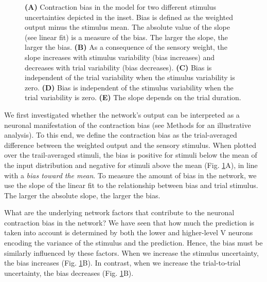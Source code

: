 \documentclass[10pt,a4paper,draft]{article}
\begin{document}
\begin{figure}[t!]
{{\bf (A)} Contraction bias in the model for two different stimulus uncertainties depicted in the inset. Bias is defined as the weighted output minus the stimulus mean. The absolute value of the slope (see linear fit) is a measure of the bias. The larger the slope, the larger the bias.
{\bf (B)}  As a consequence of the sensory weight, the slope increases with stimulus variability (bias increases) and decreases with trial variability (bias decreases).
{\bf (C)} Bias is independent of the trial variability when the stimulus variability is zero.
{\bf (D)} Bias is independent of the stimulus variability when the trial variability is zero.
{\bf (E)} The slope depends on the trial duration.
}
\label{fig:Fig_5}
\end{figure}
%

We first investigated whether the network's output can be interpreted as a neuronal manifestation of the contraction bias (see Methods for an illustrative analysis). To this end, we define the contraction bias as the trial-averaged difference between the weighted output and the sensory stimulus. When plotted over the trail-averaged stimuli, the bias is positive for stimuli below the mean of the input distribution and negative for stimuli above the mean (Fig. \ref{fig:Fig_5}A), in line with a \textit{bias toward the mean}. To measure the amount of bias in the network, we use the slope of the linear fit to the relationship between bias and trial stimulus. The larger the absolute slope, the larger the bias. 

What are the underlying network factors that contribute to the neuronal contraction bias in the network? We have seen that how much the prediction is taken into account is determined by both the lower and higher-level V neurons encoding the variance of the stimulus and the prediction. Hence, the bias must be similarly influenced by these factors. When we increase the stimulus uncertainty, the bias increases (Fig. \ref{fig:Fig_5}B). In contrast, when we increase the trial-to-trial uncertainty, the bias decreases (Fig. \ref{fig:Fig_5}B). 
\end{document}
